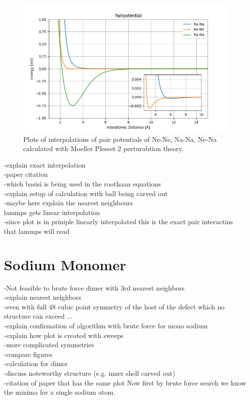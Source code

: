 \begin{figure}[h!]
	\centering
	\includegraphics[scale = 0.7]{Inhalt/Bilder/pairpotential.png}
	\caption{Plots of interpolations of pair potentials of Ne-Ne, Na-Na, Ne-Na calculated with Moeller Plesset 2 perturabtion theory.}
\end{figure}
-explain exact interpolation\\
-paper citation\\
-which basisi is being used in the roothaan equations \\
-explain setup of calculation with ball being carved out\\
-maybe here explain the nearest neighbours\\
lammps gets linear interpolation\\
-since plot is in priniple linearly interpolated this is the exact pair interactins that lammps will read
\section{Sodium Monomer}
-Not feasible to brute force dimer with 3rd nearest neighbors\\
-explain nearest neighbors\\
-even with full 48 cubic point symmetry of the host of the defect which no structure can exceed ...\\ 
-explain confirmation of algorithm with brute force for mono sodium\\
-explain how plot is created with sweeps\\
-more complicated symmetries\\
-compare figures\\
-calculation for dimer\\
-discuss noteworthy structure (e.g. inner shell carved out)\\
-citation of paper that has the same plot
Now first by brute force search we know the minima for a single sodium atom.

